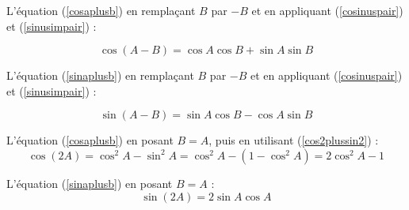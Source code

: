 ﻿L'équation (\ref{cosaplusb}) en remplaçant $B$ par $-B$ et en appliquant (\ref{cosinuspair}) et (\ref{sinusimpair}) :

\begin{equation}
\cos(A-B) = \cos{A}\cos{B} + \sin{A}\sin{B}
\label{cosamoinsb}
\end{equation}

L'équation (\ref{sinaplusb}) en remplaçant $B$ par $-B$ et en appliquant (\ref{cosinuspair}) et (\ref{sinusimpair}) :

\begin{equation}
\sin(A-B) = \sin{A}\cos{B} - \cos{A}\sin{B}
\label{sinamoinsb}
\end{equation}

L'équation (\ref{cosaplusb}) en posant $B=A$, puis en utilisant (\ref{cos2plussin2}) :
\begin{equation}
\cos(2A) = \cos^2{A} - \sin^2{A} = \cos^2{A} - (1-\cos^2{A}) = 2\cos^2A-1
\label{cos2a}
\end{equation}

L'équation (\ref{sinaplusb}) en posant $B=A$ :
\begin{equation}
\sin(2A) = 2\sin{A}\cos{A}
\end{equation}
